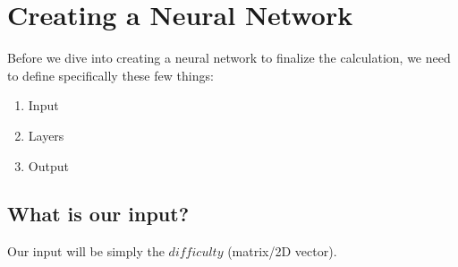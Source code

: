 

\section{Creating a Neural Network}

Before we dive into creating a neural network to finalize the calculation, we need to define specifically these few things:

\begin{enumerate}
	\item Input
	\item Layers
	\item Output
\end{enumerate}

\subsection{What is our input?}

Our input will be simply the $difficulty$ (matrix/2D vector).


